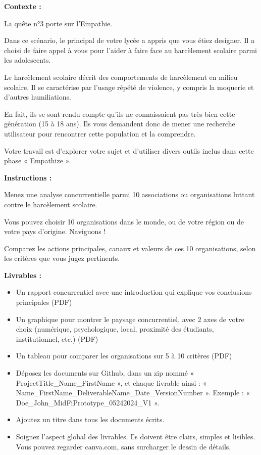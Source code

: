 \makeheaderfiles

\textbf{Contexte :}

La quête n°3 porte sur l'Empathie.

Dans ce scénario, le principal de votre lycée a appris que vous étiez designer. Il a choisi de faire appel à vous pour l'aider à faire face au harcèlement scolaire parmi les adolescents.

Le harcèlement scolaire décrit des comportements de harcèlement en milieu scolaire. Il se caractérise par l'usage répété de violence, y compris la moquerie et d'autres humiliations.

En fait, ils se sont rendu compte qu'ils ne connaissaient pas très bien cette génération (15 à 18 ans). Ils vous demandent donc de mener une recherche utilisateur pour rencontrer cette population et la comprendre.

Votre travail est d'explorer votre sujet et d'utiliser divers outils inclus dans cette phase « Empathize ».

\textbf{Instructions :}

Menez une analyse concurrentielle parmi 10 associations ou organisations luttant contre le harcèlement scolaire.

Vous pouvez choisir 10 organisations dans le monde, ou de votre région ou de votre pays d'origine. Naviguons !

Comparez les actions principales, canaux et valeurs de ces 10 organisations, selon les critères que vous jugez pertinents.

\textbf{Livrables :}

\begin{itemize}
\item Un rapport concurrentiel avec une introduction qui explique vos conclusions principales (PDF)
\item Un graphique pour montrer le paysage concurrentiel, avec 2 axes de votre choix (numérique, psychologique, local, proximité des étudiants, institutionnel, etc.) (PDF)
\item Un tableau pour comparer les organisations sur 5 à 10 critères (PDF)
\item Déposez les documents sur Github, dans un zip nommé « ProjectTitle\_Name\_FirstName », et chaque livrable ainsi : « Name\_FirstName\_DeliverableName\_Date\_VersionNumber ». Exemple : « Doe\_John\_MidFiPrototype\_05242024\_V1 ».
\item Ajoutez un titre dans tous les documents écrits.
\item Soignez l'aspect global des livrables. Ils doivent être clairs, simples et lisibles. Vous pouvez regarder canva.com, sans surcharger le dessin de détails.
\end{itemize}

